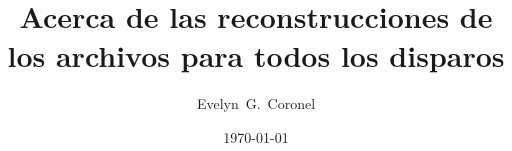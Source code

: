 



\title{Acerca de las reconstrucciones de los archivos para todos los disparos}
\author{Evelyn~G.~Coronel}


\date[]{\lowercase{\today}} %


\maketitle


